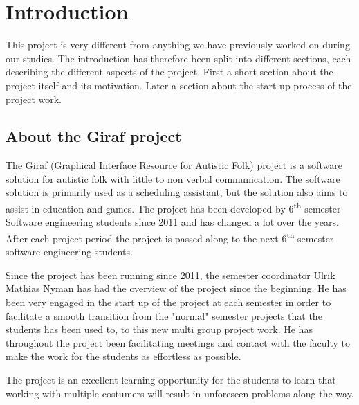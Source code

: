 \chapter{Introduction}
This project is very different from anything we have previously worked on during our studies. 
The introduction has therefore been split into different sections, each describing the different aspects of the project. 
First a short section about the project itself and its motivation. 
Later a section about the start up process of the project work. 

\section{About the Giraf project}
The Giraf (Graphical Interface Resource for Autistic Folk) project is a software solution for autistic folk with little to non verbal communication.
The software solution is primarily used as a scheduling assistant, but the solution also aims to assist in education and games. 
The project has been developed by 6\textsuperscript{th} semester Software engineering students since 2011 and has changed a lot over the years. 
After each project period the project is passed along to the next 6\textsuperscript{th} semester software engineering students.

Since the project has been running since 2011, the semester coordinator Ulrik Mathias Nyman  has had the overview of the project since the beginning. 
He has been very engaged in the start up of the project at each semester in order to facilitate a smooth transition from the "normal" semester projects that the students has been used to, to this new multi group project work. 
He has throughout the project been facilitating meetings and contact with the faculty to make the work for the students as effortless as possible.

The project is an excellent learning opportunity for the students to learn that working with multiple costumers will result in unforeseen problems along the way.

